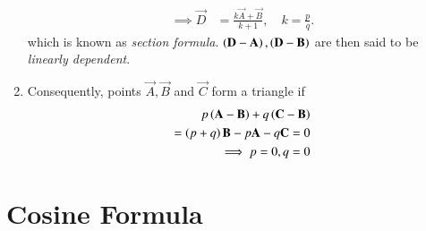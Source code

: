 \begin{enumerate}[label=\thesection.\arabic*.,ref=\thesection.\theenumi]
\begin{align}
			\implies \vec{D} &= \frac{k\vec{A}+\vec{B}}{k+1}, \quad k = \frac{p}{q}.
	  \label{eq:section_formula}
			\end{align} 
	which is known as {\em section formula}. $\left(\mathbf{D}-\mathbf{A}\right), \left(\mathbf{D}-\mathbf{B}\right)$ 
		are then said to be {\em linearly dependent}.
  \item Consequently, points $\vec{A},\vec{B}$ and $\vec{C}$ form a triangle  if 
	  \label{prop:two-tri-indep}
  \begin{align}
	  p\left(\mathbf{A}- \mathbf{B}\right) +q\left(\mathbf{C} -\mathbf{B}\right) 
	  \\
	  =\left(p+q\right)\mathbf{B}- p\mathbf{A} -q\mathbf{C} = 0
	  \\
	  \implies p=0, q=0
	  \label{eq:two-tri-indep}
  \end{align}
\end{enumerate}
\section{Cosine Formula}
